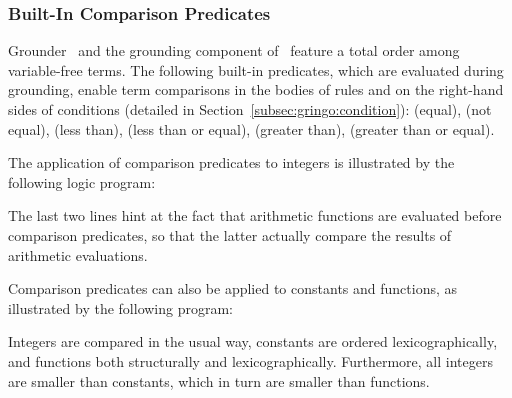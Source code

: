 \subsubsection{Built-In Comparison Predicates}\label{subsec:gringo:comp}

Grounder \gringo\ and the grounding component of \clingo\ 
feature a total order among variable-free terms.
The following built-in predicates, which are evaluated during grounding, 
enable term comparisons in the bodies of rules and on the right-hand sides of conditions
(detailed in Section~\ref{subsec:gringo:condition}):
\code{==} (equal),
\code{!=} (not equal),
\code{<} (less than),
\code{<=} (less than or equal),
\code{>} (greater than),
\code{>=} (greater than or equal).

\begin{example}\label{ex:arith:pred}
The application of comparison predicates to integers
is illustrated by the following logic program:%
%

%
The last two lines hint at the fact that arithmetic functions are evaluated
before comparison predicates, so that the latter actually compare the
results of arithmetic evaluations.
\eexample
\end{example}

\begin{example}\label{ex:symb:pred}
Comparison predicates can also be applied to constants and functions,
as illustrated by the following program:%
%

%
Integers are compared in the usual way, constants are ordered lexicographically,
and functions both structurally and lexicographically.
Furthermore, all integers are smaller than constants,
which in turn are smaller than functions.
\eexample
\end{example}

